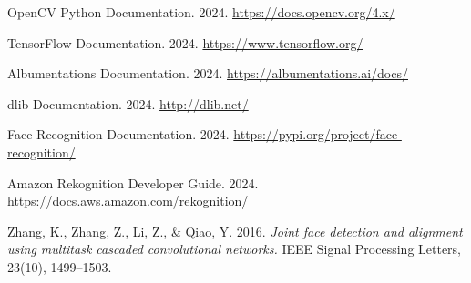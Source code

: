 \begin{thebibliography}{99}
OpenCV Python Documentation. 2024. \url{https://docs.opencv.org/4.x/}

TensorFlow Documentation. 2024. \url{https://www.tensorflow.org/}

Albumentations Documentation. 2024. \url{https://albumentations.ai/docs/}

dlib Documentation. 2024. \url{http://dlib.net/}

Face Recognition Documentation. 2024. \url{https://pypi.org/project/face-recognition/}

Amazon Rekognition Developer Guide. 2024. \url{https://docs.aws.amazon.com/rekognition/}

Zhang, K., Zhang, Z., Li, Z., \& Qiao, Y. 2016. \emph{Joint face detection and alignment using multitask cascaded convolutional networks.} IEEE Signal Processing Letters, 23(10), 1499--1503.

\end{thebibliography}
